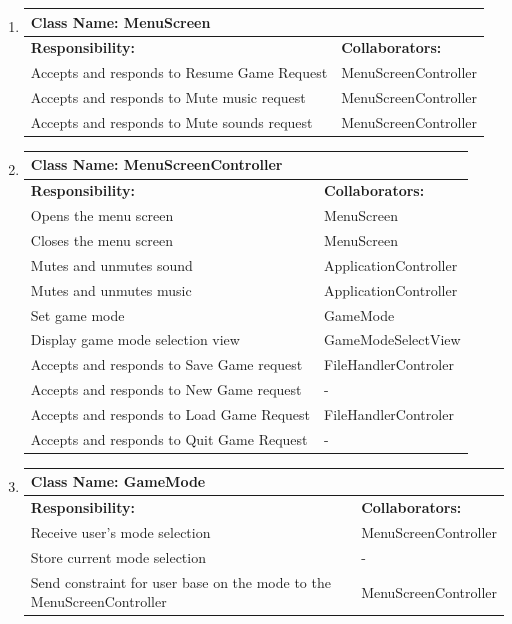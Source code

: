 \documentclass[]{article}
\begin{document}
\begin{enumerate}[1.]
\begin{tabular}{|p{10cm}|p{4cm}|}
	    \hline
	  \end{tabular}

	\item
	\begin{tabular}{|p{10cm}|p{4cm}|}
	    \hline
	     \multicolumn{2}{|l|}{\textbf{Class Name:  MenuScreen}} \\
	    \hline
	    \textbf{Responsibility:} & \textbf{Collaborators:} \\
	    \hline
	    Accepts and responds to Resume Game Request & MenuScreenController \\
	Accepts and responds to Mute music request & MenuScreenController \\
	Accepts and responds to Mute sounds request & MenuScreenController \\

	    \hline
	  \end{tabular}

	\item
	\begin{tabular}{|p{10cm}|p{4cm}|}
	    \hline
	     \multicolumn{2}{|l|}{\textbf{Class Name:  MenuScreenController}} \\
	    \hline
	    \textbf{Responsibility:} & \textbf{Collaborators:} \\
	    \hline
	    Opens the menu screen & MenuScreen \\
	Closes the menu screen & MenuScreen \\
	Mutes and unmutes sound & ApplicationController \\
	Mutes and unmutes music & ApplicationController \\
	Set game mode & GameMode \\
	Display game mode selection view & GameModeSelectView \\
	Accepts and responds to Save Game request & FileHandlerControler \\
	Accepts and responds to New Game request & - \\
	Accepts and responds to Load Game Request & FileHandlerControler \\
	Accepts and responds to Quit Game Request & - \\

	    \hline
	  \end{tabular}

	\item
	\begin{tabular}{|p{10cm}|p{4cm}|}
	    \hline
	     \multicolumn{2}{|l|}{\textbf{Class Name:  GameMode}} \\
	    \hline
	    \textbf{Responsibility:} & \textbf{Collaborators:} \\
	    \hline
	    Receive user’s mode selection & MenuScreenController \\
	Store current mode selection & - \\
	Send constraint for user base on the mode to the MenuScreenController & MenuScreenController \\


\end{tabular}
\end{enumerate}
\end{document}
